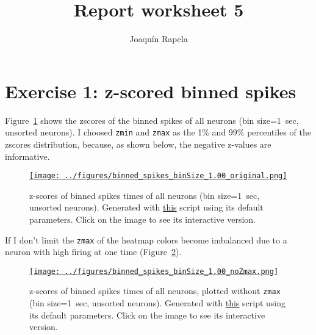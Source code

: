 \documentclass[12pt]{article}
\title{Report worksheet 5}
\author{Joaqu\'{i}n Rapela}
\begin{document}
\maketitle

\section*{Exercise 1: z-scored binned spikes}

Figure~\ref{fig:zscores_unsorted} shows the zscores of the binned spikes of all
neurons (bin size=1~sec, unsorted neurons). I choosed \texttt{zmin} and
\texttt{zmax} as the 1\% and 99\% percentiles of the zscores distribution,
because, as shown below, the negative z-values are informative.


\begin{figure}[H]
    \begin{center}
        \href{https://www.gatsby.ucl.ac.uk/~rapela/neuroinformatics/2023/ws5/figures/binned_spikes_binSize_1.00_original.html}{\texttt{[image: ../figures/binned\_spikes\_binSize\_1.00\_original.png]}}

        \caption{z-scores of binned spikes times of all neurons (bin
        size=1~sec, unsorted neurons).  Generated with
        \href{https://github.com/joacorapela/neuroinformatics23/blob/master/worksheets/ws5/mySolution/code/scripts/doEx1Plotly.py}{this}
        script using its default parameters. Click on the image to see its
        interactive version.}

        \label{fig:zscores_unsorted}
    \end{center}
\end{figure}

If I don't limit the \texttt{zmax} of the heatmap colors become imbalanced due
to a neuron with high firing at one time
(Figure~\ref{fig:zscores_unsorted_noZmax}). 

\begin{figure}[H]
    \begin{center}
        \href{https://www.gatsby.ucl.ac.uk/~rapela/neuroinformatics/2023/ws5/figures/binned_spikes_binSize_1.00_noZmax.html}{\texttt{[image: ../figures/binned\_spikes\_binSize\_1.00\_noZmax.png]}}

        \caption{z-scores of binned spikes times of all neurons, plotted
        without \texttt{zmax} (bin size=1~sec, unsorted neurons). Generated
        with
        \href{https://github.com/joacorapela/neuroinformatics23/blob/master/worksheets/ws5/mySolution/code/scripts/doEx1Plotly.py}{this}
        script using its default parameters. Click on the image to see its
        interactive version.}

        \label{fig:zscores_unsorted_noZmax}
    \end{center}
\end{figure}
\end{document}

